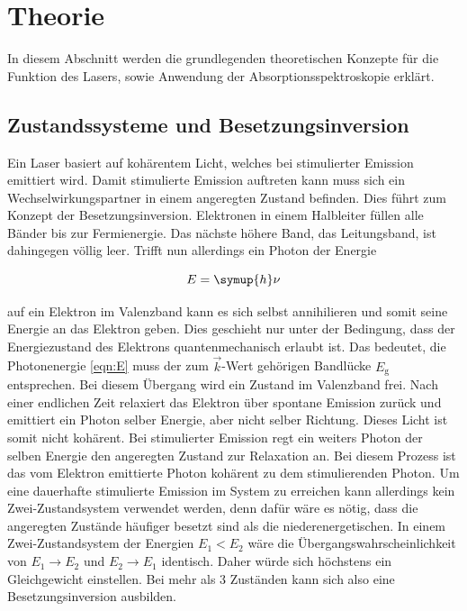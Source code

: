 \chapter{Theorie}
\label{cha:Theorie}

In diesem Abschnitt werden die grundlegenden theoretischen Konzepte für die Funktion des Lasers, sowie Anwendung der Absorptionsspektroskopie erklärt. 

\section{Zustandssysteme und Besetzungsinversion}
\label{sec:inv}

Ein Laser basiert auf kohärentem Licht, welches bei stimulierter Emission emittiert wird. Damit stimulierte Emission auftreten kann muss sich ein Wechselwirkungspartner in einem 
angeregten Zustand befinden. Dies führt zum Konzept der Besetzungsinversion. Elektronen in einem Halbleiter füllen alle Bänder bis zur Fermienergie. Das nächste höhere Band,
das Leitungsband, ist dahingegen völlig leer. Trifft nun allerdings ein Photon der Energie 

\begin{equation}
    \label{eqn:E}
    E = \symup{h}\nu
\end{equation}

auf ein Elektron im Valenzband kann es sich selbst annihilieren und somit seine Energie an das Elektron geben. Dies geschieht nur unter der Bedingung, dass der Energiezustand des 
Elektrons quantenmechanisch erlaubt ist. Das bedeutet, die Photonenergie \ref{eqn:E} muss der zum $\vec{k}$-Wert gehörigen Bandlücke $E_\text{g}$ entsprechen. Bei diesem Übergang wird 
ein Zustand im Valenzband frei. Nach einer endlichen Zeit relaxiert das Elektron über spontane Emission zurück und emittiert ein Photon selber Energie, aber nicht selber Richtung. 
Dieses Licht ist somit nicht kohärent. Bei stimulierter Emission regt ein weiters Photon der selben Energie den angeregten Zustand zur Relaxation an. Bei diesem Prozess ist das 
vom Elektron emittierte Photon kohärent zu dem stimulierenden Photon. Um eine dauerhafte stimulierte Emission im System zu erreichen kann allerdings kein Zwei-Zustandsystem verwendet 
werden, denn dafür wäre es nötig, dass die angeregten Zustände häufiger besetzt sind als die niederenergetischen. In einem Zwei-Zustandsystem der Energien $E_1 < E_2$ wäre die 
Übergangswahrscheinlichkeit von $E_1 \rightarrow E_2$ und $E_2 \rightarrow E_1$ identisch. Daher würde sich höchstens ein Gleichgewicht einstellen. Bei mehr als 3 Zuständen 
kann sich also eine Besetzungsinversion ausbilden. 

